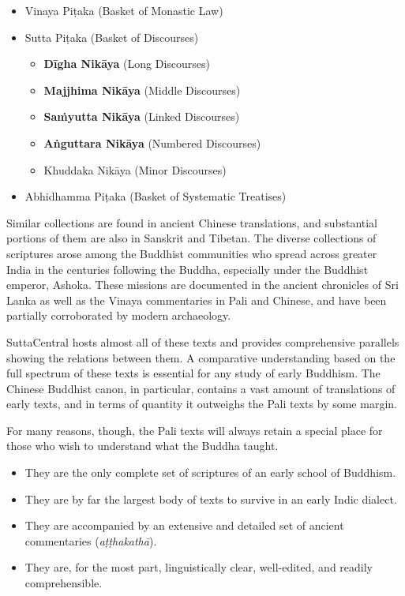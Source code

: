 \documentclass[12pt,openany]{book}%
\begin{document}
\begin{itemize}%
\item Vinaya \textsanskrit{Piṭaka} (Basket of Monastic Law)%
\item Sutta \textsanskrit{Piṭaka} (Basket of Discourses)
\begin{itemize}%
\item \textbf{\textsanskrit{Dīgha} \textsanskrit{Nikāya}} (Long Discourses)%
\item \textbf{Majjhima \textsanskrit{Nikāya}} (Middle Discourses)%
\item \textbf{\textsanskrit{Saṁyutta} \textsanskrit{Nikāya}} (Linked Discourses)%
\item \textbf{\textsanskrit{Aṅguttara} \textsanskrit{Nikāya}} (Numbered Discourses)%
\item Khuddaka \textsanskrit{Nikāya} (Minor Discourses)%
\end{itemize}

%
\item Abhidhamma \textsanskrit{Piṭaka} (Basket of Systematic Treatises)%
\end{itemize}

Similar collections are found in ancient Chinese translations, and substantial portions of them are also in Sanskrit and Tibetan. The diverse collections of scriptures arose among the Buddhist communities who spread across greater India in the centuries following the Buddha, especially under the Buddhist emperor, Ashoka. These missions are documented in the ancient chronicles of Sri Lanka as well as the Vinaya commentaries in Pali and Chinese, and have been partially corroborated by modern archaeology.

SuttaCentral hosts almost all of these texts and provides comprehensive parallels showing the relations between them. A comparative understanding based on the full spectrum of these texts is essential for any study of early Buddhism. The Chinese Buddhist canon, in particular, contains a vast amount of translations of early texts, and in terms of quantity it outweighs the Pali texts by some margin.

For many reasons, though, the Pali texts will always retain a special place for those who wish to understand what the Buddha taught.

\begin{itemize}%
\item They are the only complete set of scriptures of an early school of Buddhism.%
\item They are by far the largest body of texts to survive in an early Indic dialect.%
\item They are accompanied by an extensive and detailed set of ancient commentaries (\textit{\textsanskrit{aṭṭhakathā}}).%
\item They are, for the most part, linguistically clear, well-edited, and readily comprehensible.%
\end{itemize}
\end{document}
